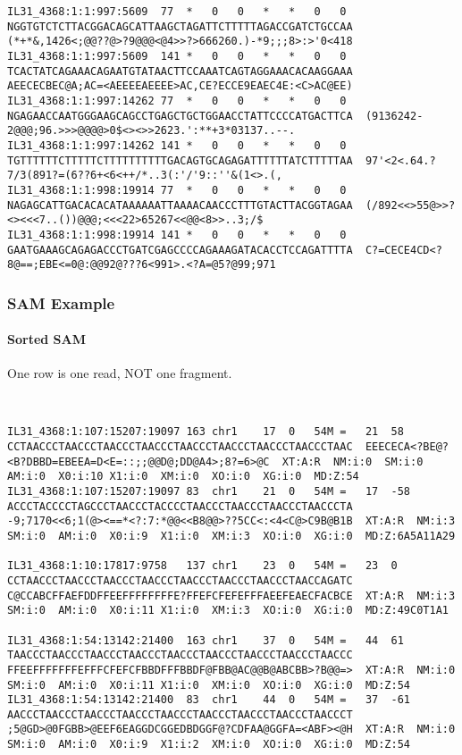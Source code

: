 \documentclass{beamer}
\begin{document}
\begin{frame}[fragile]
\begin{framed}
\begin{verbatim}
IL31_4368:1:1:997:5609	77	*	0	0	*	*	0	0	NGGTGTCTCTTACGGACAGCATTAAGCTAGATTCTTTTTAGACCGATCTGCCAA	(*+*&,1426<;@@??@>?9@@@<@4>>?>666260.)-*9;;;8>:>'0<418
IL31_4368:1:1:997:5609	141	*	0	0	*	*	0	0	TCACTATCAGAAACAGAATGTATAACTTCCAAATCAGTAGGAAACACAAGGAAA	AEECECBEC@A;AC=<AEEEEAEEEE>AC,CE?ECCE9EAEC4E:<C>AC@EE)
IL31_4368:1:1:997:14262	77	*	0	0	*	*	0	0	NGAGAACCAATGGGAAGCAGCCTGAGCTGCTGGAACCTATTCCCCATGACTTCA	(9136242-2@@@;96.>>>@@@@>0$<><>>2623.':**+3*03137..--.
IL31_4368:1:1:997:14262	141	*	0	0	*	*	0	0	TGTTTTTTCTTTTTCTTTTTTTTTTGACAGTGCAGAGATTTTTTATCTTTTTAA	97'<2<.64.?7/3(891?=(6??6+<6<++/*..3(:'/'9::''&(1<>.(,
IL31_4368:1:1:998:19914	77	*	0	0	*	*	0	0	NAGAGCATTGACACACATAAAAAATTAAAACAACCCTTTGTACTTACGGTAGAA	(/892<<>55@>>?<><<<7..())@@@;<<<22>65267<<@@<8>>..3;/$
IL31_4368:1:1:998:19914	141	*	0	0	*	*	0	0	GAATGAAAGCAGAGACCCTGATCGAGCCCCAGAAAGATACACCTCCAGATTTTA	C?=CECE4CD<?8@==;EBE<=0@:@@92@???6<991>.<?A=@5?@99;971
\end{verbatim}
\end{framed}
\end{frame}



\begin{frame}[fragile]
\frametitle{SAM Example}
\framesubtitle{Sorted SAM}
One row is one read, NOT one fragment.
\begin{framed}\tiny
\begin{verbatim}


IL31_4368:1:107:15207:19097	163	chr1	17	0	54M	=	21	58	CCTAACCCTAACCCTAACCCTAACCCTAACCCTAACCCTAACCCTAACCCTAAC	EEECECA<?BE@?<B?DBBD=EBEEA=D<E=::;;@@D@;DD@A4>;8?=6>@C	XT:A:R	NM:i:0	SM:i:0	AM:i:0	X0:i:10	X1:i:0	XM:i:0	XO:i:0	XG:i:0	MD:Z:54
IL31_4368:1:107:15207:19097	83	chr1	21	0	54M	=	17	-58	ACCCTACCCCTAGCCCTAACCCTACCCCTAACCCTAACCCTAACCCTAACCCTA	-9;7170<<6;1(@><==*<?:7:*@@<<B8@@>??5CC<:<4<C@>C9B@B1B	XT:A:R	NM:i:3	SM:i:0	AM:i:0	X0:i:9	X1:i:0	XM:i:3	XO:i:0	XG:i:0	MD:Z:6A5A11A29

IL31_4368:1:10:17817:9758	137	chr1	23	0	54M	=	23	0	CCTAACCCTAACCCTAACCCTAACCCTAACCCTAACCCTAACCCTAACCAGATC	C@CCABCFFAEFDDFFEEFFFFFFFFE?FFEFCFEFEFFFAEEFEAECFACBCE	XT:A:R	NM:i:3	SM:i:0	AM:i:0	X0:i:11	X1:i:0	XM:i:3	XO:i:0	XG:i:0	MD:Z:49C0T1A1

IL31_4368:1:54:13142:21400	163	chr1	37	0	54M	=	44	61	TAACCCTAACCCTAACCCTAACCCTAACCCTAACCCTAACCCTAACCCTAACCC	FFEEFFFFFFFEFFFCFEFCFBBDFFFBBDF@FBB@AC@@B@ABCBB>?B@@=>	XT:A:R	NM:i:0	SM:i:0	AM:i:0	X0:i:11	X1:i:0	XM:i:0	XO:i:0	XG:i:0	MD:Z:54
IL31_4368:1:54:13142:21400	83	chr1	44	0	54M	=	37	-61	AACCCTAACCCTAACCCTAACCCTAACCCTAACCCTAACCCTAACCCTAACCCT	;5@GD>@0FGBB>@EEF6EAGGDCGGEDBDGGF@?CDFAA@GGFA=<ABF><@H	XT:A:R	NM:i:0	SM:i:0	AM:i:0	X0:i:9	X1:i:2	XM:i:0	XO:i:0	XG:i:0	MD:Z:54


\end{verbatim}
\end{framed}
\end{frame}
\end{document}
